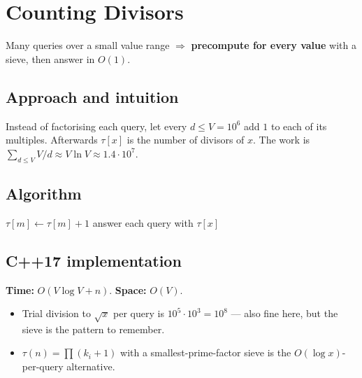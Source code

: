 \section{Counting Divisors}
\label{sec:n-count-div}


\begin{patternbox}
Many queries over a small value range $\Rightarrow$ \textbf{precompute for
every value} with a sieve, then answer in $O(1)$.
\end{patternbox}

\subsection*{Approach and intuition}

Instead of factorising each query, let every $d\le V=10^6$ add $1$ to each of
its multiples. Afterwards $\tau[x]$ is the number of divisors of $x$. The work
is $\sum_{d\le V}V/d\approx V\ln V\approx1.4\cdot10^7$.

\subsection*{Algorithm}
\begin{algorithmic}[1]
  $\tau[m]\gets\tau[m]+1$ \EndFor \EndFor
\State answer each query with $\tau[x]$
\end{algorithmic}


\subsection*{C++17 implementation}

\begin{complexitybox}
\textbf{Time:} $O(V\log V+n)$. \textbf{Space:} $O(V)$.
\end{complexitybox}

\begin{pitfallbox}
\begin{itemize}
  \item Trial division to $\sqrt x$ per query is $10^5\cdot10^3=10^8$ ---
        also fine here, but the sieve is the pattern to remember.
  \item $\tau(n)=\prod(k_i+1)$ with a smallest-prime-factor sieve is the
        $O(\log x)$-per-query alternative.
\end{itemize}
\end{pitfallbox}
